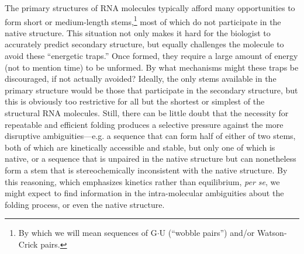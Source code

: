 \documentclass[10pt,letterpaper]{article}
\begin{document}
The primary structures of RNA molecules typically afford many opportunities to form short or medium-length stems,\footnote{
By which we will mean sequences of G$\cdot$U (``wobble pairs'') and/or Watson-Crick pairs.}
most of which do not participate in the native structure. This situation not only makes it hard for the biologist to accurately predict secondary structure, but equally challenges the molecule to avoid these ``energetic traps.'' Once formed, they require a large amount of energy (not to mention time) to be unformed. By what mechanisms might these traps be discouraged, if not actually avoided? 
Ideally, the only stems available in the primary structure would be those that participate in the secondary structure, but this is obviously too restrictive for all but the shortest or simplest of the structural RNA molecules. Still, there can be little doubt that the necessity for repeatable and efficient folding produces a selective pressure against the more disruptive ambiguities---e.g.
a sequence that can form half of either of two stems, both of which are kinetically accessible and stable, but only one of which is native, or a sequence that is unpaired in the native structure but can nonetheless form a stem that is stereochemically inconsistent with the native structure. By this reasoning, which emphasizes kinetics rather than equilibrium, {\em per se}, we might expect to find information in the intra-molecular ambiguities about the folding process, or even the native structure.  
\end{document}
